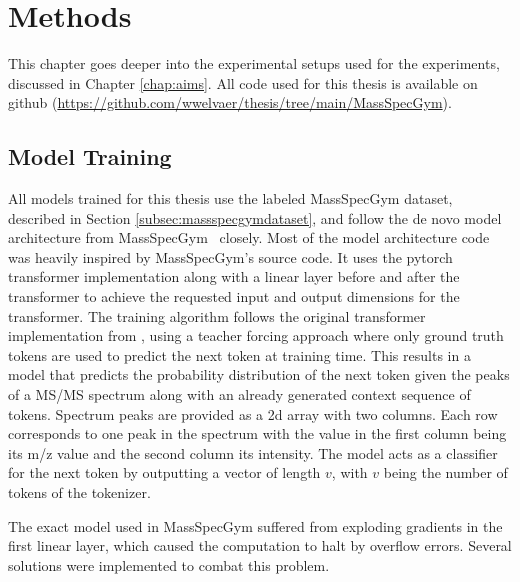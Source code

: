 \chapter{Methods}
\label{chap:methods}

This chapter goes deeper into the experimental setups used for the experiments, discussed in Chapter \ref{chap:aims}.
All code used for this thesis is available on github (\url{https://github.com/wwelvaer/thesis/tree/main/MassSpecGym}).

\section{Model Training}
\label{sec:training}

All models trained for this thesis use the labeled MassSpecGym dataset, described in Section \ref{subsec:massspecgymdataset}, and follow the de novo model architecture from MassSpecGym~\cite{bushuiev2024massspecgym} closely.
Most of the model architecture code was heavily inspired by MassSpecGym's source code.
It uses the pytorch transformer implementation along with a linear layer before and after the transformer to achieve the requested input and output dimensions for the transformer.
The training algorithm follows the original transformer implementation from \textcite{vaswani2017attention}, using a teacher forcing approach where only ground truth tokens are used to predict the next token at training time.
This results in a model that predicts the probability distribution of the next token given the peaks of a \ac{MS/MS} spectrum along with an already generated context sequence of tokens.
Spectrum peaks are provided as a 2d array with two columns. Each row corresponds to one peak in the spectrum with the value in the first column being its m/z value and the second column its intensity.
The model acts as a classifier for the next token by outputting a vector of length $v$, with $v$ being the number of tokens of the tokenizer.

The exact model used in MassSpecGym suffered from exploding gradients in the first linear layer, which caused the computation to halt by overflow errors.
Several solutions were implemented to combat this problem.

